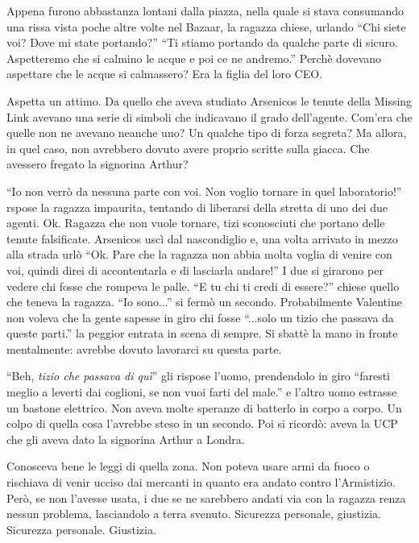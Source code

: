     Appena furono abbastanza lontani dalla piazza, nella quale si stava consumando una rissa vista poche altre volte
    nel Bazaar, la ragazza chiese, urlando ``Chi siete voi? Dove mi state portando?'' ``Ti stiamo portando da qualche
    parte di sicuro. Aspetteremo che si calmino le acque e poi ce ne andremo.'' Perchè dovevano aspettare che le acque
    si calmassero? Era la figlia del loro CEO.

    Aspetta un attimo. Da quello che aveva studiato Arsenicos le tenute della Missing Link avevano una serie di simboli
    che indicavano il grado dell'agente. Com'era che quelle non ne avevano neanche uno? Un qualche tipo di forza
    segreta? Ma allora, in quel caso, non avrebbero dovuto avere proprio scritte sulla giacca. Che avessero fregato la
    signorina Arthur?

    ``Io non verrò da nessuna parte con voi. Non voglio tornare in quel laboratorio!'' rspose la ragazza impaurita, tentando di
    liberarsi della stretta di uno dei due agenti. Ok. Ragazza che non vuole tornare, tizi sconosciuti che portano delle
    tenute falsificate. Arsenicos uscì dal nascondiglio e, una volta arrivato in mezzo alla strada urlò ``Ok. Pare che
    la ragazza non abbia molta voglia di venire con voi, quindi direi di accontentarla e di lasciarla andare!'' I due si
    girarono per vedere chi fosse che rompeva le palle. ``E tu chi ti credi di essere?'' chiese quello che teneva la
    ragazza. ``Io sono...'' si fermò un secondo. Probabilmente Valentine non voleva che la gente sapesse in giro chi
    fosse ``...solo un tizio che passava da queste parti.'' la peggior entrata in scena di sempre. Si sbattè la mano in
    fronte mentalmente: avrebbe dovuto lavorarci su questa parte.

    ``Beh, \emph{tizio che passava di quì}'' gli rispose l'uomo, prendendolo in giro ``faresti meglio a leverti dai
    coglioni, se non vuoi farti del male.'' e l'altro uomo estrasse un bastone elettrico. Non aveva molte speranze di
    batterlo in corpo a corpo. Un colpo di quella cosa l'avrebbe steso in un secondo. Poi si ricordò: aveva la UCP che
    gli aveva dato la signorina Arthur a Londra.

    Conosceva bene le leggi di quella zona. Non poteva usare armi da fuoco o rischiava di venir ucciso dai mercanti in
    quanto era andato contro l'Armistizio. Però, se non l'avesse usata, i due se ne sarebbero andati via con la ragazza
    renza nessun problema, lasciandolo a terra svenuto. Sicurezza personale, giustizia. Sicurezza personale. Giustizia.

